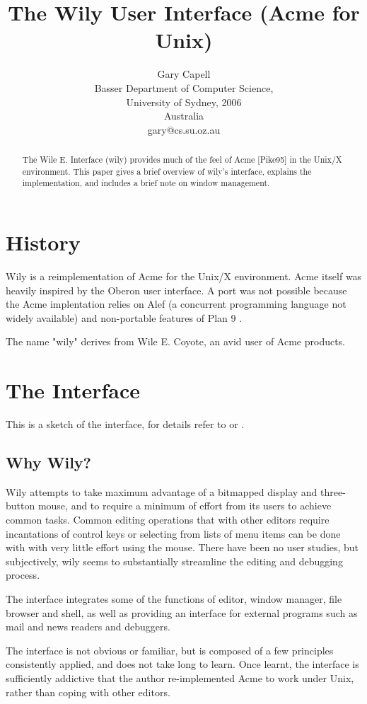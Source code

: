 \documentclass[twocolumn]{article}
\title{The Wily User Interface (Acme for Unix)}
\author{Gary Capell\\
Basser Department of Computer Science,\\
University of Sydney, 2006\\
Australia\\
gary@cs.su.oz.au}
\begin{document}
\maketitle

\begin{abstract}
The Wile E. Interface (wily) provides much of the feel of
Acme [Pike95] in the Unix/X environment.
This paper gives a brief overview of wily's interface, explains
the implementation, and includes a brief note on window management.

\end{abstract}
\section{History}

Wily is a reimplementation of Acme \cite{acme}
for the Unix/X environment. Acme itself was
heavily inspired by the Oberon \cite{oberon} user
interface. A port was not possible because the
Acme implentation relies on Alef \cite{alef}(a
concurrent programming language not widely
available) and non-portable features of Plan 9
\cite{9BLabs}.

The name "wily" derives from Wile E. Coyote, an avid user of
Acme products.

\section{The Interface}
This is a sketch of the interface, for details
refer to \cite{acme} or \cite{wilyu}.

	\subsection{Why Wily?}

Wily attempts to take maximum advantage of a
bitmapped display and three-button mouse, and to
require a minimum of effort from its users to
achieve common tasks. Common editing operations
that with other editors require incantations of
control keys or selecting from lists of menu
items can be done with with very little effort
using the mouse. There have been no user studies,
but subjectively, wily seems to substantially
streamline the editing and debugging process.

The interface integrates some of the functions of editor,
window manager, file browser and shell, as well as providing
an interface for external programs such as mail and news
readers and debuggers.

The interface is not obvious or familiar, but is composed of
a few principles consistently applied, and does not take long to
learn.  Once learnt, the interface is sufficiently addictive that
the author re-implemented Acme to work under Unix, rather
than coping with other editors.
\end{document}
